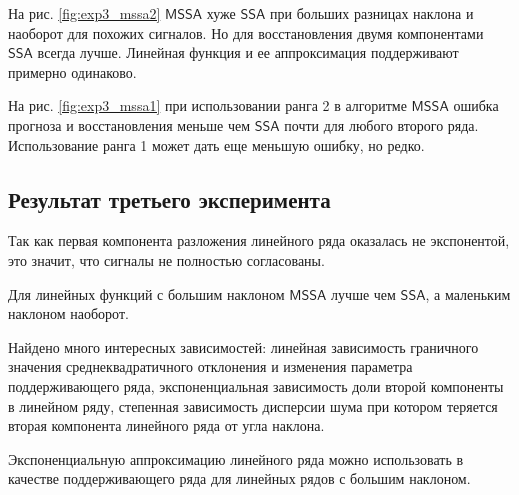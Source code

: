 \documentclass[specialist, substylefile = spbureport.rtx,
    subf,href,colorlinks=true, 12pt]{disser}
\newcommand{\SSA}{\mathsf{SSA}}
\newcommand{\MSSA}{\mathsf{MSSA}}
\begin{document}
        На рис. \ref{fig:exp3_mssa2} $\MSSA$ хуже $\SSA$ при больших разницах наклона и наоборот для похожих сигналов. Но для восстановления двумя компонентами $\SSA$ всегда лучше. Линейная функция и ее аппроксимация поддерживают примерно одинаково.

        На рис. \ref{fig:exp3_mssa1} при использовании ранга 2 в алгоритме $\MSSA$ ошибка прогноза и восстановления меньше чем $\SSA$ почти для любого второго ряда. Использование ранга 1 может дать еще меньшую ошибку, но редко. 


    \subsection{Результат третьего эксперимента}
        Так как первая компонента разложения линейного ряда оказалась не экспонентой, это значит, что сигналы не полностью согласованы.

        Для линейных функций с большим наклоном $\MSSA$ лучше чем $\SSA$, а маленьким наклоном наоборот.




    \conclusion
        Найдено много интересных зависимостей: линейная зависимость граничного значения среднеквадратичного отклонения и изменения параметра поддерживающего ряда, экспоненциальная зависимость доли второй компоненты в линейном ряду, степенная зависимость дисперсии шума при котором теряется вторая компонента линейного ряда от угла наклона.

        Экспоненциальную аппроксимацию линейного ряда можно использовать в качестве поддерживающего ряда для линейных рядов с большим наклоном.
 
        

    

	\renewcommand{\refname}{}
	\vspace{-25pt}
	
	
\end{document}
